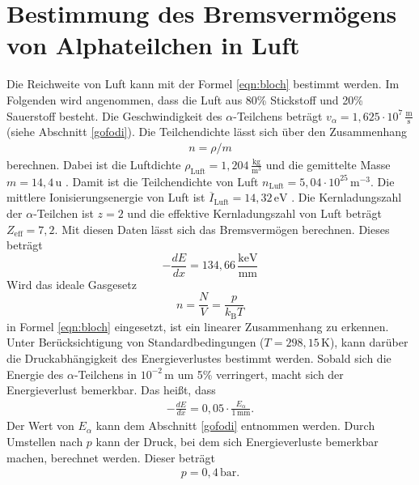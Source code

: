 \section{Bestimmung des Bremsvermögens von Alphateilchen in Luft}
Die Reichweite von Luft kann mit der Formel \eqref{eqn:bloch} bestimmt werden.
Im Folgenden wird angenommen, dass die Luft aus 80\% Stickstoff und 20\% Sauerstoff besteht.
Die Geschwindigkeit des $\alpha$-Teilchens beträgt $v_{\alpha}= 1,625\cdot10^{7}\,\frac{\text{m}}{\text{s}}$ (siehe Abschnitt \ref{gofodi}).
Die Teilchendichte lässt sich über den Zusammenhang
\begin{align*}
  n = \rho/m
\end{align*}
berechnen.
Dabei ist die Luftdichte $\rho_{\text{Luft}} = 1,204\,\frac{\text{kg}}{\text{m}^3}$ \cite{chem2} und die gemittelte Masse
$m = 14,4 \,\text{u}$ \cite{PSE}.
Damit ist die Teilchendichte von Luft $n_{\text{Luft}} = 5,04\cdot10^{25}\,\text{m}^{-3}$.
Die mittlere Ionisierungsenergie von Luft ist
$\overline{I}_{\text{Luft}} = 14,32\,\text{eV}$ \cite{PSE}.
Die Kernladungszahl der $\alpha$-Teilchen ist $z=2$ und die effektive Kernladungszahl von Luft beträgt
$Z_{\text{eff}} = 7,2$.
Mit diesen Daten lässt sich das Bremsvermögen berechnen. Dieses beträgt
\begin{equation*}
  -\frac{dE}{dx} = 134,66\,\frac{\text{keV}}{\text{mm}}
\end{equation*}
Wird das ideale Gasgesetz
\begin{equation}
  n = \frac{N}{V} = \frac{p}{k_{\text{B}}T}
\end{equation}
in Formel \eqref{eqn:bloch} eingesetzt,
ist ein linearer Zusammenhang zu erkennen.
Unter Berücksichtigung von Standardbedingungen ($T= 298,15\,\text{K}$), kann darüber die Druckabhängigkeit des Energieverlustes bestimmt werden.
Sobald sich die Energie des $\alpha$-Teilchens in $10^{-2}\,\text{m}$ um 5\% verringert, macht sich der Energieverlust bemerkbar.
Das heißt, dass
\begin{align*}
  -\frac{dE}{dx} = 0,05\cdot\frac{E_{\alpha}}{1\,\text{mm}}.
\end{align*}
Der Wert von $E_{\alpha}$ kann dem Abschnitt \ref{gofodi} entnommen werden.
Durch Umstellen nach $p$ kann der Druck, bei dem sich Energieverluste bemerkbar machen, berechnet werden.
Dieser beträgt
\begin{align*}
  p = 0,4\,\text{bar}.
\end{align*}
